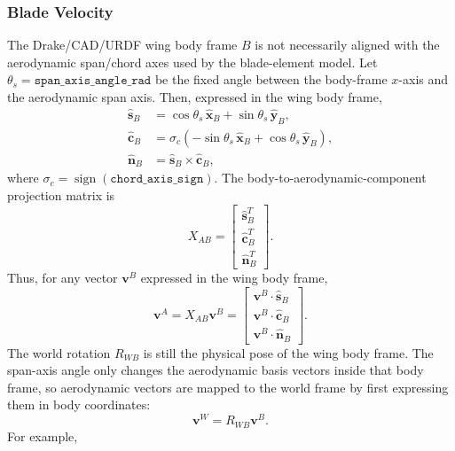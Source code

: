 \documentclass{article}
\begin{document}
\subsubsection{Blade Velocity}
The Drake/CAD/URDF wing body frame \(B\) is not necessarily aligned with the aerodynamic span/chord axes used by the blade-element model. Let \(\theta_s = \texttt{span\_axis\_angle\_rad}\) be the fixed angle between the body-frame \(x\)-axis and the aerodynamic span axis. Then, expressed in the wing body frame,
\begin{align}
    \hat{\mathbf{s}}_B
        &= \cos\theta_s\,\hat{\mathbf{x}}_B
        + \sin\theta_s\,\hat{\mathbf{y}}_B, \\
    \hat{\mathbf{c}}_B
        &= \sigma_c
        \left(
            -\sin\theta_s\,\hat{\mathbf{x}}_B
            + \cos\theta_s\,\hat{\mathbf{y}}_B
        \right), \\
    \hat{\mathbf{n}}_B
        &= \hat{\mathbf{s}}_B \times \hat{\mathbf{c}}_B,
\end{align}
where \(\sigma_c = \operatorname{sign}(\texttt{chord\_axis\_sign})\). The body-to-aerodynamic-component projection matrix is
\begin{equation}
    X_{AB}
    =
    \begin{bmatrix}
        \hat{\mathbf{s}}_B^T\\
        \hat{\mathbf{c}}_B^T\\
        \hat{\mathbf{n}}_B^T
    \end{bmatrix}.
\end{equation}
Thus, for any vector \(\mathbf{v}^B\) expressed in the wing body frame,
\begin{equation}
    \mathbf{v}^A
    =
    X_{AB}\mathbf{v}^B
    =
    \begin{bmatrix}
        \mathbf{v}^B\cdot\hat{\mathbf{s}}_B\\
        \mathbf{v}^B\cdot\hat{\mathbf{c}}_B\\
        \mathbf{v}^B\cdot\hat{\mathbf{n}}_B
    \end{bmatrix}.
\end{equation}
The world rotation \(R_{WB}\) is still the physical pose of the wing body frame. The span-axis angle only changes the aerodynamic basis vectors inside that body frame, so aerodynamic vectors are mapped to the world frame by first expressing them in body coordinates:
\begin{equation}
    \mathbf{v}^W = R_{WB}\mathbf{v}^B.
\end{equation}
For example,
\end{document}
